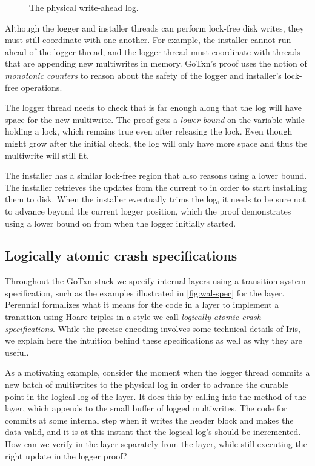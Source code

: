 \begin{figure}
    \centering
    
    \caption{The physical write-ahead log.}
    \label{fig:physlog}
\end{figure}

Although the logger and installer threads can perform lock-free disk
writes, they must still coordinate with one another.  For example,
the installer cannot run ahead of the logger thread, and the logger
thread must coordinate with threads that are appending new multiwrites
in memory. GoTxn's proof uses the notion of \emph{monotonic counters} to reason
about the safety of the logger and installer's lock-free operations.

The logger thread needs to check that  is far enough along that the
log will have space for the new multiwrite. The proof gets a \emph{lower bound}
on the  variable while holding a lock, which remains true even
after releasing the lock. Even though  might grow after the initial
check, the log will only have more space and thus the multiwrite will still fit.

The installer has a similar lock-free region that also reasons using a lower
bound. The installer retrieves the updates from the current  to
 in order to start installing them to disk. When the installer
eventually trims the log, it needs to be sure not to advance beyond the current
logger position, which the proof demonstrates using a lower bound on
 from when the logger initially started.

\subsection{Logically atomic crash specifications}
\label{s:proof:logatom}


Throughout the GoTxn stack we specify internal layers using a transition-system
specification, such as the examples illustrated in \cref{fig:wal-spec} for
the  layer. Perennial formalizes what it means for the code in a layer to
implement a transition using Hoare triples in a style we call
\emph{logically atomic crash specifications}. While the precise encoding
involves some technical details of Iris, we explain here the intuition behind these
specifications as well as why they are useful.

As a motivating example, consider the moment when the logger thread commits a
new batch of multiwrites to the physical log in order to advance the durable
point  in the logical log of the  layer. It does this by calling into the
 method of the  layer, which appends to the small
buffer of logged multiwrites. The code for  commits at some internal
step when it writes the header block and makes the data valid, and it is at this
instant that the logical log's  should be incremented.
How can we verify  in the  layer separately from the  layer,
while still executing the right update in the logger proof?


